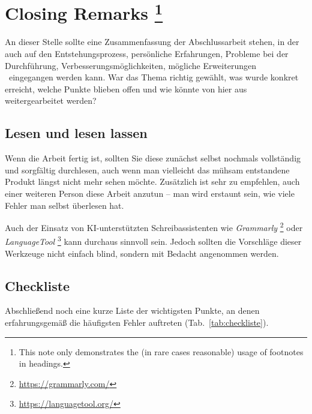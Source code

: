 \chapter[Closing Remarks]{Closing Remarks%
\protect\footnote{This note only demonstrates the (in rare cases reasonable)
usage of footnotes in headings.}}%
\label{cha:Closing}

An dieser Stelle sollte eine Zusammenfassung der Abschlussarbeit stehen, in
der auch auf den Entstehungsprozess, persönliche Erfahrungen, Probleme bei
der Durchführung, Verbesserungsmöglichkeiten, mögliche Erweiterungen \usw\
eingegangen werden kann. War das Thema richtig gewählt, was wurde konkret
erreicht, welche Punkte blieben offen und wie könnte von hier aus
weitergearbeitet werden?


\section{Lesen und lesen lassen}

Wenn die Arbeit fertig ist, sollten Sie diese zunächst selbst nochmals
vollständig und sorgfältig durchlesen, auch wenn man vielleicht das mühsam
entstandene Produkt längst nicht mehr sehen möchte. Zusätzlich ist sehr zu
empfehlen, auch einer weiteren Person diese Arbeit anzutun -- man wird
erstaunt sein, wie viele Fehler man selbst überlesen hat.

Auch der Einsatz von KI-unterstützten Schreibassistenten wie \zB
\emph{Grammarly}%
\footnote{\url{https://grammarly.com/}} oder \emph{LanguageTool}%
\footnote{\url{https://languagetool.org/}} kann durchaus sinnvoll sein.
Jedoch sollten die Vorschläge dieser Werkzeuge nicht einfach blind, sondern
mit Bedacht angenommen werden.


\section{Checkliste}

Abschließend noch eine kurze Liste der wichtigsten Punkte, an denen
erfahrungsgemäß die häufigsten Fehler auftreten (Tab.\ \ref{tab:checkliste}).

